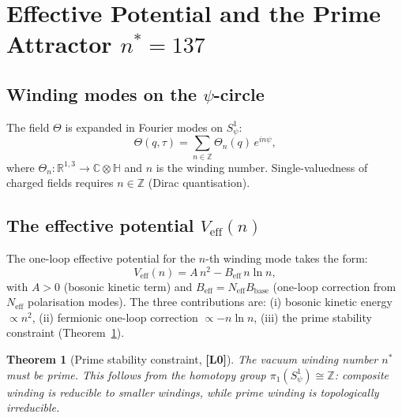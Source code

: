 \documentclass[11pt,a4paper]{article}
\newtheorem{theorem}{Theorem}
\theoremstyle{definition}
\theoremstyle{remark}
\newcommand{\Lzero}{\textbf{[L0]}}
\begin{document}
\section{Effective Potential and the Prime Attractor $n^* = 137$}
\label{sec:veff}


\subsection{Winding modes on the $\psi$-circle}

The field $\Theta$ is expanded in Fourier modes on $S^1_\psi$:
\begin{equation}
  \Theta(q,\tau) = \sum_{n \in \mathbb{Z}} \Theta_n(q)\, e^{in\psi},
\end{equation}
where $\Theta_n : \mathbb{R}^{1,3} \to \mathbb{C}\otimes\mathbb{H}$ and
$n$ is the winding number. Single-valuedness of charged fields requires
$n \in \mathbb{Z}$ (Dirac quantisation).

\subsection{The effective potential $V_{\mathrm{eff}}(n)$}

The one-loop effective potential for the $n$-th winding mode takes the form:
\begin{equation}
  V_{\mathrm{eff}}(n) = A\, n^2 - B_{\mathrm{eff}}\, n \ln n,
  \label{eq:veff_form}
\end{equation}
with $A > 0$ (bosonic kinetic term) and $B_{\mathrm{eff}} = N_{\mathrm{eff}} B_{\mathrm{base}}$
(one-loop correction from $N_{\mathrm{eff}}$ polarisation modes).
The three contributions are: (i) bosonic kinetic energy $\propto n^2$,
(ii) fermionic one-loop correction $\propto -n \ln n$,
(iii) the prime stability constraint (Theorem~\ref{thm:prime_stability}).

\begin{theorem}[Prime stability constraint, {\Lzero}]
  \label{thm:prime_stability}
  The vacuum winding number $n^*$ must be prime.
  This follows from the homotopy group $\pi_1(S^1_\psi) \cong \mathbb{Z}$:
  composite winding is reducible to smaller windings, while prime winding
  is topologically irreducible.
\end{theorem}
\end{document}
